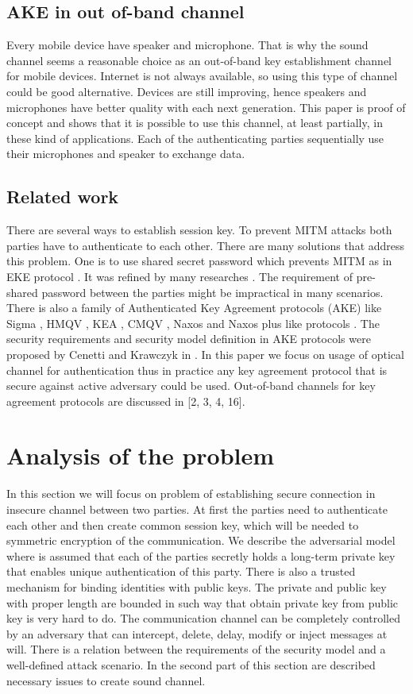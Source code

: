 \documentclass[11pt,titlepage]{article}
\theoremstyle{plain}
\begin{document}
\subsection{AKE in out of-band channel}
Every mobile device have speaker and microphone. That is why the sound channel seems a reasonable choice as an out-of-band key establishment channel for mobile devices. Internet is not always available, so using this type of channel could be good alternative. Devices are still improving, hence speakers and microphones have better quality with each next generation. This paper is proof of concept and shows that it is possible to use this channel, at least partially, in these kind of applications. Each of the authenticating parties sequentially use their microphones and speaker to exchange data.


\subsection{Related work}
There are several ways to establish session key. To prevent MITM attacks both parties have to authenticate to each other. There are many solutions that address this problem. One is to use shared secret password which prevents MITM as in EKE protocol \cite{EKE}. It was refined by many researches \cite{EKE, EKE2}. The requirement of pre-shared password between the parties might be impractical in many scenarios. There is also a family of Authenticated Key Agreement protocols (AKE) like Sigma \cite{sign_mac}, HMQV \cite{HMQV}, KEA \cite{KEA}, CMQV \cite{CMQV}, Naxos and Naxos plus like protocols \cite{AMA, NAXOS}. The security requirements and security model definition in AKE protocols were proposed by Cenetti and Krawczyk in \cite{cankraw1, cankraw2}. In this paper we focus on usage of optical channel for authentication thus in practice any key agreement protocol that is secure against active adversary could be used. Out-of-band channels for key agreement protocols are discussed in [2, 3, 4, 16].

\section{Analysis of the problem}

In this section we will focus on problem of establishing secure connection in insecure channel between two parties. At first the parties need to authenticate each other and then create common session key, which will be needed to symmetric encryption of the communication. We describe the adversarial model where is assumed that each of the parties secretly holds a long-term private key that enables unique authentication of this party. There is also a trusted mechanism for binding identities with public keys. The private and public key with proper length are bounded in such way that obtain private key from public key is very hard to do. The communication channel can be completely controlled by an adversary that can intercept, delete, delay, modify or inject messages at will. There is a relation between the requirements of the security model and a well-defined attack scenario. In the second part of this section are described necessary issues to create sound channel.
\end{document}

